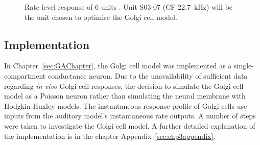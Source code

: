 \begin{figure}[ht!]
  \centering
  \caption{Rate level response of 6 units \citep[from Fig.~2]{GhoshalKim:1997}. Unit S03-07 (CF 22.7~kHz) will be the unit chosen to optimise the Golgi cell model.}\label{fig:GolgiKimFig2}
\end{figure}

\subsection{Implementation}

In Chapter~\ref{sec:GAChapter}, the Golgi cell model was implemented as a
single-compartment conductance neuron. Due to the unavailability of sufficient
data regarding \emph{in vivo} Golgi cell responses, the decision to simulate the
Golgi cell model as a Poisson neuron rather than simulating the neural membrane
with Hodgkin-Huxley models.  The instantaneous response profile of Golgi cells
use inputs from the auditory model's instantaneous rate outputs.  A number of
steps were taken to investigate the Golgi cell model. A further detailed
explanation of the implementation is in the chapter
Appendix~\ref{sec:chp3appendix}.  %

